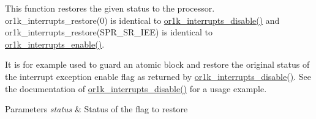 This function restores the given status to the processor. or1k\-\_\-interrupts\-\_\-restore(0) is identical to \hyperlink{group__or1k__interrupts_ga6596faf65911ecbcc9881937971946f3}{or1k\-\_\-interrupts\-\_\-disable()} and or1k\-\_\-interrupts\-\_\-restore(\-S\-P\-R\-\_\-\-S\-R\-\_\-\-I\-E\-E) is identical to \hyperlink{group__or1k__interrupts_ga344fd4bd73d40748de810eda21f0f47c}{or1k\-\_\-interrupts\-\_\-enable()}.

It is for example used to guard an atomic block and restore the original status of the interrupt exception enable flag as returned by \hyperlink{group__or1k__interrupts_ga6596faf65911ecbcc9881937971946f3}{or1k\-\_\-interrupts\-\_\-disable()}. See the documentation of \hyperlink{group__or1k__interrupts_ga6596faf65911ecbcc9881937971946f3}{or1k\-\_\-interrupts\-\_\-disable()} for a usage example.


\begin{DoxyParams}{Parameters}
{\em status} & Status of the flag to restore \\
\hline
\end{DoxyParams}
